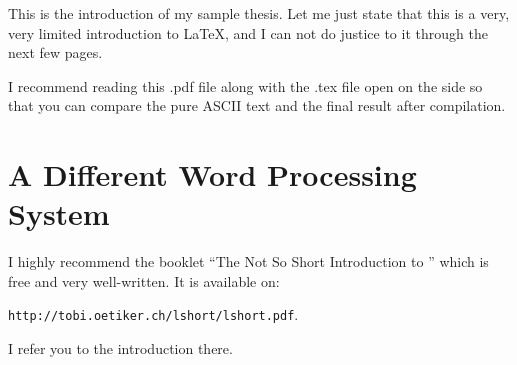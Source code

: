 This is the introduction of my sample thesis. Let me just state that
this is a very, very limited introduction to \LaTeX, and I can not
do justice to it through the next few pages.

I recommend reading this .pdf file along with the .tex file open on
the side so that you can compare the pure ASCII text and the final
result after compilation.

\section{A Different Word Processing System} \label{ch:anotherintro}
I highly recommend the booklet ``The Not So Short Introduction to
\LaTeXe{}'' which is free and very well-written. It is available on:
\begin{center}
\verb|http://tobi.oetiker.ch/lshort/lshort.pdf|.
\end{center}

\noindent I refer you to the introduction there.
